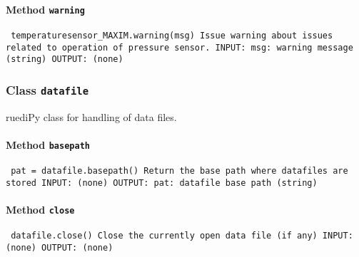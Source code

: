 \paragraph{Method \texttt{warning}}
\vspace{1ex}
\texttt{\newline
temperaturesensor_MAXIM.warning(msg)\newline
\newline
Issue warning about issues related to operation of pressure sensor.\newline
\newline
INPUT:\newline
msg: warning message (string)\newline
\newline
OUTPUT:\newline
(none)\newline
\newline
}

\subsubsection{Class \texttt{datafile}}
\par
ruediPy class for handling of data files.\par

\paragraph{Method \texttt{basepath}}
\vspace{1ex}
\texttt{\newline
pat = datafile.basepath()\newline
\newline
Return the base path where datafiles are stored\newline
\newline
INPUT:\newline
(none)\newline
\newline
OUTPUT:\newline
pat: datafile base path (string)\newline
\newline
}

\paragraph{Method \texttt{close}}
\vspace{1ex}
\texttt{\newline
datafile.close()\newline
\newline
Close the currently open data file (if any)\newline
\newline
INPUT:\newline
(none)\newline
\newline
OUTPUT:\newline
(none)\newline
\newline
}

